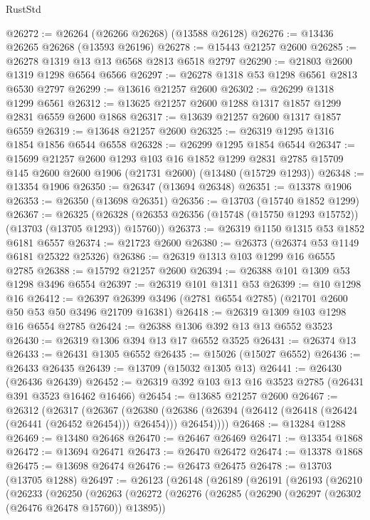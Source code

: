 \begin{lexlean}{RustStd}
\begin{coremodule}
@26272 := @26264 (@26266 @26268) (@13588 @26128)
@26276 := @13436 @26265 @26268 (@13593 @26196)
@26278 := @15443 @21257 @2600
@26285 := @26278 @1319 @13 @13 @6568 @2813 @6518 @2797
@26290 := @21803 @2600 @1319 @1298 @6564 @6566
@26297 := @26278 @1318 @53 @1298 @6561 @2813 @6530 @2797
@26299 := @13616 @21257 @2600
@26302 := @26299 @1318 @1299 @6561
@26312 := @13625 @21257 @2600 @1288 @1317 @1857 @1299 @2831 @6559 @2600 @1868
@26317 := @13639 @21257 @2600 @1317 @1857 @6559
@26319 := @13648 @21257 @2600
@26325 := @26319 @1295 @1316 @1854 @1856 @6544 @6558
@26328 := @26299 @1295 @1854 @6544
@26347 := @15699
    @21257
    @2600
    @1293
    @103
    @16
    @1852
    @1299
    @2831
    @2785
    @15709
    @145
    @2600
    @2600
    @1906
    (@21731 @2600)
    (@13480 (@15729 @1293))
@26348 := @13354 @1906
@26350 := @26347 (@13694 @26348)
@26351 := @13378 @1906
@26353 := @26350 (@13698 @26351)
@26356 := @13703 (@15740 @1852 @1299)
@26367 := @26325
    (@26328 (@26353 @26356 (@15748 (@15750 @1293 @15752)) (@13703 (@13705 @1293)) @15760))
@26373 := @26319 @1150 @1315 @53 @1852 @6181 @6557
@26374 := @21723 @2600
@26380 := @26373 (@26374 @53 @1149 @6181 @25322 @25326)
@26386 := @26319 @1313 @103 @1299 @16 @6555 @2785
@26388 := @15792 @21257 @2600
@26394 := @26388 @101 @1309 @53 @1298 @3496 @6554
@26397 := @26319 @101 @1311 @53
@26399 := @10 @1298 @16
@26412 := @26397 @26399 @3496 (@2781 @6554 @2785) (@21701 @2600 @50 @53 @50 @3496 @21709 @16381)
@26418 := @26319 @1309 @103 @1298 @16 @6554 @2785
@26424 := @26388 @1306 @392 @13 @13 @6552 @3523
@26430 := @26319 @1306 @394 @13 @17 @6552 @3525
@26431 := @26374 @13
@26433 := @26431 @1305 @6552
@26435 := @15026 (@15027 @6552)
@26436 := @26433 @26435
@26439 := @13709 (@15032 @1305 @13)
@26441 := @26430 (@26436 @26439)
@26452 := @26319 @392 @103 @13 @16 @3523 @2785 (@26431 @391 @3523 @16462 @16466)
@26454 := @13685 @21257 @2600
@26467 := @26312
    (@26317
      (@26367
        (@26380
          (@26386 (@26394 (@26412 (@26418 (@26424 (@26441 (@26452 @26454))) @26454))) @26454))))
@26468 := @13284 @1288
@26469 := @13480 @26468
@26470 := @26467 @26469
@26471 := @13354 @1868
@26472 := @13694 @26471
@26473 := @26470 @26472
@26474 := @13378 @1868
@26475 := @13698 @26474
@26476 := @26473 @26475
@26478 := @13703 (@13705 @1288)
@26497 := @26123
    (@26148
      (@26189
        (@26191
          (@26193
            (@26210
              (@26233
                (@26250
                  (@26263
                    (@26272
                      (@26276
                        (@26285
                          (@26290 (@26297 (@26302 (@26476 @26478 @15760)) @13895))

\end{coremodule}
\end{lexlean}
